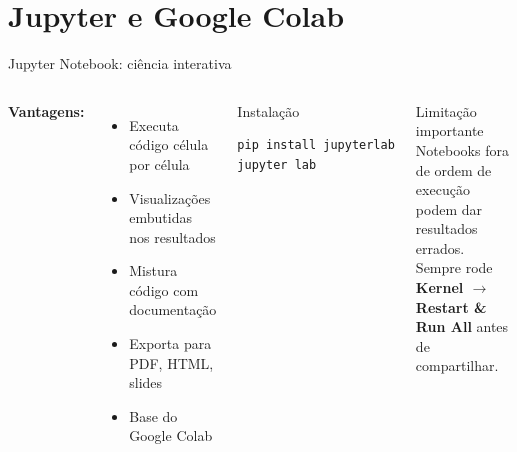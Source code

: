 \section{Jupyter e Google Colab}

\begin{frame}[fragile, shrink=15]{Jupyter Notebook: ciência interativa}

\vspace{0.3cm}

\begin{columns}
\textbf{Vantagens:}
\begin{itemize}
    \item Executa código célula por célula
    \item Visualizações embutidas nos resultados
    \item Mistura código com documentação
    \item Exporta para PDF, HTML, slides
    \item Base do Google Colab
\end{itemize}

\begin{exampleblock}{Instalação}
\begin{lstlisting}[language=bash, numbers=none, basicstyle=\ttfamily\small]
pip install jupyterlab
jupyter lab
\end{lstlisting}
\end{exampleblock}

\vspace{0.4cm}
\begin{alertblock}{Limitação importante}
Notebooks fora de ordem de execução podem dar resultados errados. Sempre rode \textbf{Kernel $\to$ Restart \& Run All} antes de compartilhar.
\end{alertblock}
\end{columns}
\end{frame}

